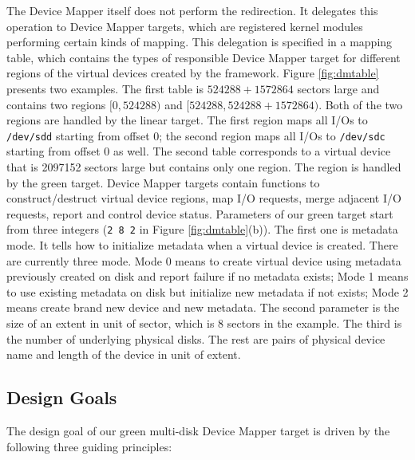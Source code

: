 The Device Mapper itself does not perform the redirection. It
delegates this operation to Device Mapper targets, which are
registered kernel modules performing certain kinds of mapping. This
delegation is specified in a mapping table, which contains the types
of responsible Device Mapper target for different regions of the
virtual devices created by the framework. Figure \ref{fig:dmtable}
presents two examples. The first table is $524288+1572864$ sectors
large and contains two regions $[0, 524288)$ and $[524288,
524288+1572864)$.  Both of the two regions are handled by the linear
target. The first region maps all I/Os to \texttt{/dev/sdd} starting
from offset 0; the second region maps all I/Os to \texttt{/dev/sdc}
starting from offset 0 as well. The second table corresponds to a
virtual device that is 2097152 sectors large but contains only one
region. The region is handled by the green target.  Device Mapper
targets contain functions to construct/destruct virtual device
regions, map I/O requests, merge adjacent I/O requests, report and
control device status. Parameters of our green target start from three
integers (\texttt{2 8 2} in Figure \ref{fig:dmtable}(b)). The first
one is metadata mode. It tells how to initialize metadata when a
virtual device is created. There are currently three mode. Mode 0
means to create virtual device using metadata previously created on
disk and report failure if no metadata exists; Mode 1 means to use
existing metadata on disk but initialize new metadata if not exists;
Mode 2 means create brand new device and new metadata.  The second
parameter is the size of an extent in unit of sector, which is 8
sectors in the example. The third is the number of underlying physical
disks. The rest are pairs of physical device name and length of the
device in unit of extent. 

\subsection{Design Goals}
The design goal of our green multi-disk Device Mapper target is driven
by the following three guiding principles: 

